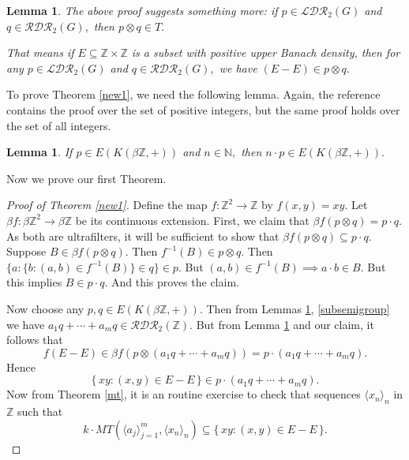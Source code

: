\documentclass{article}
\theoremstyle{Theorem}
\newtheorem{lem}[thm]{Lemma}
\theoremstyle{definition}
\newcommand{\N}{\mathbb{N}}
\newcommand{\Z}{\mathbb{Z}}
\begin{document}
\begin{lem}\label{otimes} The above proof suggests something more: if $p\in \mathcal{LDR}_2(G)$ and $ q\in \mathcal{RDR}_2(G),$ then $p\otimes q\in T.$ 

That means if $E\subseteq \Z\times \Z$ is a subset with positive upper Banach density, then for any $p\in \mathcal{LDR}_2(G)$ and $ q\in \mathcal{RDR}_2(G),$  we have $(E-E)\in p\otimes q.$
\end{lem}

To prove Theorem \ref{new1}, we need the following lemma. Again, the reference contains the proof over the set of positive integers, but the same proof holds over the set of all integers.

\begin{lem}\label{product}\cite[Lemma 5.19.2]{book}
    If $p\in E(K(\beta \Z,+))$ and $n\in \N,$ then $n\cdot p\in E(K(\beta \Z,+)).$
\end{lem}


Now we prove our first Theorem.

\begin{proof}[Proof of Theorem \ref{new1}]
Define the map $f:\Z^2\to \Z$ by $f(x,y)=xy.$ Let $\beta f:\beta \Z^2\to \beta \Z$ be its continuous extension. First, we claim that $\beta f(p\otimes q)=p\cdot q.$ As both are ultrafilters, it will be sufficient to show that $\beta f(p\otimes q) \subseteq p\cdot q.$ Suppose $B\in \beta f(p\otimes q).$ Then $f^{-1}(B)\in p\otimes q. $ Then $\{a:\{b: (a,b)\in f^{-1}(B)\}\in q\}\in p.$ But $(a,b)\in f^{-1}(B)\implies a\cdot b\in B.$ But this implies $B\in p\cdot q.$ And this proves the claim. 


Now choose any $p,q\in E(K(\beta \Z,+))$. Then from Lemmas \ref{product}, \ref{subsemigroup} we have $a_1q+\cdots +a_mq\in \mathcal{RDR}_2(\Z).$ But from Lemma \ref{otimes} and our claim, it follows that $$f(E-E)\in \beta f(p\otimes (a_1q+\cdots +a_mq))=p\cdot (a_1q+\cdots +a_mq).$$ Hence $$\{\, xy : (x,y) \in E - E \,\}\in p\cdot (a_1q+\cdots +a_mq).$$ Now from Theorem \ref{mt}, it is an routine exercise to check that  sequences $\langle x_n\rangle_n$ in $\Z$ such that 
  \[
k\cdot MT\left(\langle a_j \rangle_{j=1}^m, \langle x_n\rangle_{n}\right) \subseteq \{\, xy : (x,y) \in E - E \,\}.
\]
    
\end{proof}
\end{document}
